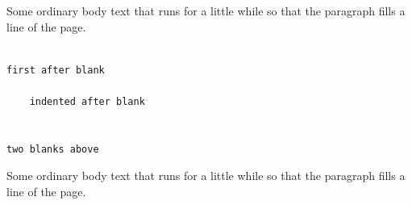 \documentclass{article}
\begin{document}
Some ordinary body text that runs for a little while so that the paragraph fills a line of the page.
\begin{verbatim}

first after blank

    indented after blank


two blanks above
\end{verbatim}

Some ordinary body text that runs for a little while so that the paragraph fills a line of the page.
\end{document}
